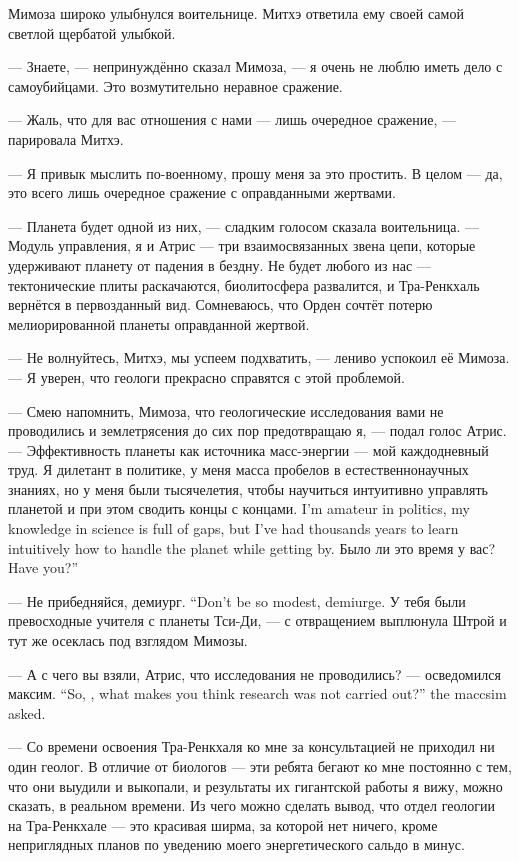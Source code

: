 Мимоза широко улыбнулся воительнице.
Митхэ ответила ему своей самой светлой щербатой улыбкой.

--- Знаете, --- непринуждённо сказал Мимоза, --- я очень не люблю иметь дело с самоубийцами.
Это возмутительно неравное сражение.

--- Жаль, что для вас отношения с нами --- лишь очередное сражение, --- парировала Митхэ.

--- Я привык мыслить по-военному, прошу меня за это простить.
В целом --- да, это всего лишь очередное сражение с оправданными жертвами.

--- Планета будет одной из них, --- сладким голосом сказала воительница.
--- Модуль управления, я и Атрис --- три взаимосвязанных звена цепи, которые удерживают планету от падения в бездну.
Не будет любого из нас --- тектонические плиты раскачаются, биолитосфера развалится, и Тра-Ренкхаль вернётся в первозданный вид.
Сомневаюсь, что Орден сочтёт потерю мелиорированной планеты оправданной жертвой.

--- Не волнуйтесь, Митхэ, мы успеем подхватить, --- лениво успокоил её Мимоза.
--- Я уверен, что геологи прекрасно справятся с этой проблемой.

--- Смею напомнить, Мимоза, что геологические исследования вами не проводились и землетрясения до сих пор предотвращаю я, --- подал голос Атрис.
--- Эффективность планеты как источника масс-энергии --- мой каждодневный труд.
{Я дилетант в политике, у меня масса пробелов в естественнонаучных знаниях, но у меня были тысячелетия, чтобы научиться интуитивно управлять планетой и при этом сводить концы с концами.}
{I'm amateur in politics, my knowledge in science is full of gaps, but I've had thousands years to learn intuitively how to handle the planet while getting by.}
{Было ли это время у вас?}
{Have you?''}

{--- Не прибедняйся, демиург.}
{``Don't be so modest, demiurge.}
У тебя были превосходные учителя с планеты Тси-Ди, --- с отвращением выплюнула Штрой и тут же осеклась под взглядом Мимозы.

{--- А с чего вы взяли, Атрис, что исследования не проводились? --- осведомился максим.}
{``So, \Aatris{}, what makes you think research was not carried out?'' the maccsim asked.}

--- Со времени освоения Тра-Ренкхаля ко мне за консультацией не приходил ни один геолог.
В отличие от биологов --- эти ребята бегают ко мне постоянно с тем, что они выудили и выкопали, и результаты их гигантской работы я вижу, можно сказать, в реальном времени.
Из чего можно сделать вывод, что отдел геологии на Тра-Ренкхале --- это красивая ширма, за которой нет ничего, кроме неприглядных планов по уведению моего энергетического сальдо в минус.

